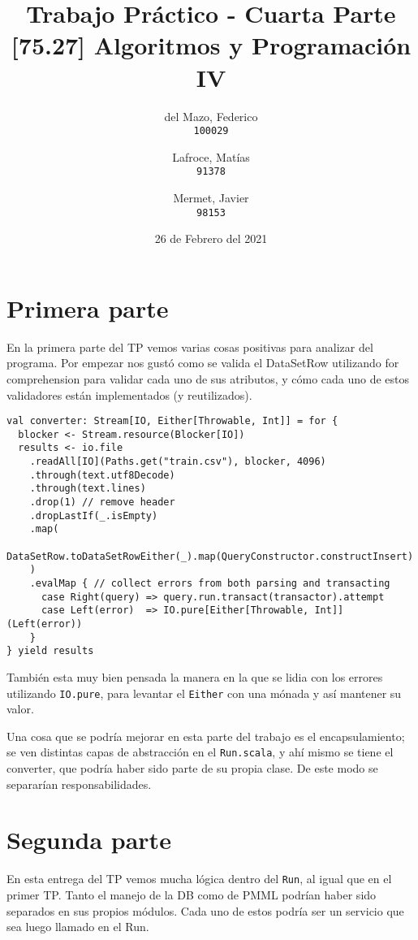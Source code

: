 \documentclass{article}
\title{Trabajo Práctico - Cuarta Parte \\ \large{[75.27] Algoritmos y Programación IV}}
\author{
	del Mazo, Federico\\
	\texttt{100029}
	\and
	Lafroce, Matías\\
	\texttt{91378}\\
	\and
	Mermet, Javier\\
	\texttt{98153}
}
\date{26 de Febrero del 2021}
\begin{document}
\maketitle


\section{Primera parte}
En la primera parte del TP vemos varias cosas positivas para analizar del programa. Por empezar nos gustó como se valida el DataSetRow utilizando for comprehension para validar cada uno de sus atributos, y cómo cada uno de estos validadores están implementados (y reutilizados).

\begin{verbatim}
val converter: Stream[IO, Either[Throwable, Int]] = for {
  blocker <- Stream.resource(Blocker[IO])
  results <- io.file
    .readAll[IO](Paths.get("train.csv"), blocker, 4096)
    .through(text.utf8Decode)
    .through(text.lines)
    .drop(1) // remove header
    .dropLastIf(_.isEmpty)
    .map(
      DataSetRow.toDataSetRowEither(_).map(QueryConstructor.constructInsert)
    )
    .evalMap { // collect errors from both parsing and transacting
      case Right(query) => query.run.transact(transactor).attempt
      case Left(error)  => IO.pure[Either[Throwable, Int]](Left(error))
    }
} yield results
\end{verbatim}

También esta muy bien pensada la manera en la que se lidia con los errores utilizando \texttt{IO.pure}, para levantar el \texttt{Either} con una mónada y así mantener su valor.

Una cosa que se podría mejorar en esta parte del trabajo es el encapsulamiento; se ven distintas capas de abstracción en el \texttt{Run.scala}, y ahí mismo se tiene el converter, que podría haber sido parte de su propia clase. De este modo se separarían responsabilidades.

\section{Segunda parte}
En esta entrega del TP vemos mucha lógica dentro del \texttt{Run}, al igual que en el primer TP. Tanto el manejo de la DB como de PMML podrían haber sido separados en sus propios módulos. Cada uno de estos podría ser un servicio que sea luego llamado en el Run.
\end{document}
